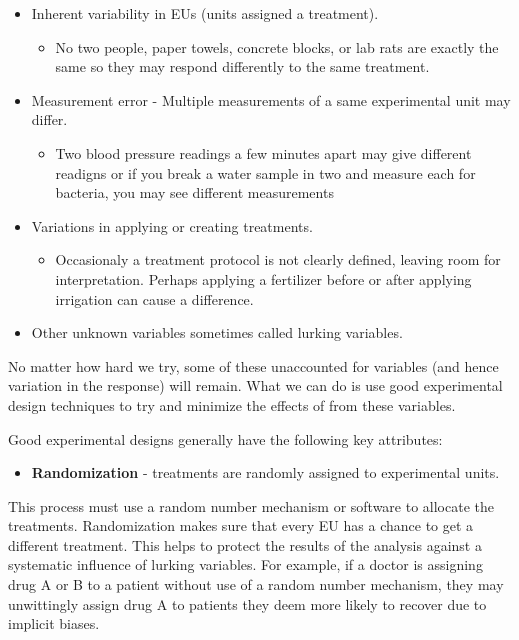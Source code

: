 \documentclass[
]{book}
\providecommand{\tightlist}{%
  \setlength{\itemsep}{0pt}\setlength{\parskip}{0pt}}
\theoremstyle{definition}
\theoremstyle{definition}
\theoremstyle{definition}
\theoremstyle{remark}
\begin{document}
\begin{itemize}
\tightlist
\item
  Inherent variability in EUs (units assigned a treatment).

  \begin{itemize}
  \tightlist
  \item
    No two people, paper towels, concrete blocks, or lab rats are exactly the same so they may respond differently to the same treatment.
  \end{itemize}
\item
  Measurement error - Multiple measurements of a same experimental unit may differ.

  \begin{itemize}
  \tightlist
  \item
    Two blood pressure readings a few minutes apart may give different readigns or if you break a water sample in two and measure each for bacteria, you may see different measurements
  \end{itemize}
\item
  Variations in applying or creating treatments.

  \begin{itemize}
  \tightlist
  \item
    Occasionaly a treatment protocol is not clearly defined, leaving room for interpretation. Perhaps applying a fertilizer before or after applying irrigation can cause a difference.
  \end{itemize}
\item
  Other unknown variables sometimes called lurking variables.
\end{itemize}

No matter how hard we try, some of these unaccounted for variables (and hence variation in the response) will remain. What we can do is use good experimental design techniques to try and minimize the effects of from these variables.

Good experimental designs generally have the following key attributes:

\begin{itemize}
\tightlist
\item
  \textbf{Randomization} - treatments are randomly assigned to experimental units.
\end{itemize}

This process must use a random number mechanism or software to allocate the treatments. Randomization makes sure that every EU has a chance to get a different treatment. This helps to protect the results of the analysis against a systematic influence of lurking variables. For example, if a doctor is assigning drug A or B to a patient without use of a random number mechanism, they may unwittingly assign drug A to patients they deem more likely to recover due to implicit biases.
\end{document}
